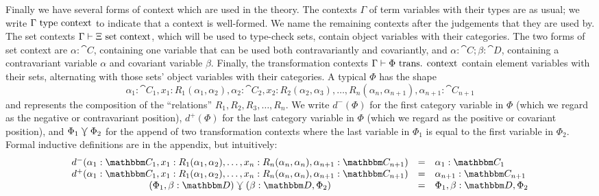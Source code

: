 \documentclass{llncs}
\begin{document}
Finally we have several forms of context which are used in the theory.
The contexts $\Gamma$ of term variables with their types are as usual;
we write ${\Gamma \,\,\textrm{type context}}$ to indicate that a context is well-formed.
We name the remaining contexts after the judgements that they are used
by.  The set contexts $\Gamma \vdash \Xi \,\,\textrm{set context}$, which will be used
to type-check sets, contain object variables with their categories. The
two forms of set context are $\alpha : \cat C$, containing one variable
that can be used both contravariantly and covariantly, and $\alpha :
\cat C ; \beta : \cat D$, containing a contravariant variable $\alpha$
and covariant variable $\beta$.  Finally, the transformation contexts
$\Gamma \vdash \Phi \,\,\textrm{trans. context}$ contain element variables with their sets, alternating with those
sets' object variables with their categories.  A typical $\Phi$ has the
shape
\[
\alpha_1 : \cat C_1, x_1:R_1(\alpha_1,\alpha_2), \alpha_2 : \cat C_2,
x_2:R_2(\alpha_2,\alpha_3), \ldots, R_n(\alpha_n,\alpha_{n+1}),
\alpha_{n+1} : \cat C_{n+1}
\]
and represents the composition of the ``relations'' $R_1, R_2, R_3, \ldots,
R_n$.  We write $d^-(\Phi)$ for the first category variable in $\Phi$
(which we regard as the negative or contravariant position), $d^+(\Phi)$
for the last category variable in $\Phi$ (which we regard as the
positive or covariant position), and $\Phi_1 \curlyveedownarrow \Phi_2$ for the append
of two transformation contexts where the last variable in $\Phi_1$ is equal to
the first variable in $\Phi_2$.  Formal inductive definitions are in the
appendix, but intuitively: 
\[
\begin{array}{ccl}
d^-(\alpha_1 : \cat C_1, x_1:R_1(\alpha_1,\alpha_2), \ldots, x_n:R_n(\alpha_n,\alpha_n), \alpha_{n+1} : \cat C_{n+1}) & = & \alpha_1 : \cat C_1\\
d^+(\alpha_1 : \cat C_1, x_1:R_1(\alpha_1,\alpha_2), \ldots, x_n:R_n(\alpha_n,\alpha_n), \alpha_{n+1} : \cat C_{n+1}) & = & \alpha_{n+1}:\cat C_{n+1}\\
(\Phi_1,\beta:\cat D) \jnctx (\beta:\cat D, \Phi_2) & = & \Phi_1, \beta : \cat D, \Phi_2
\end{array}
\]
\end{document}

